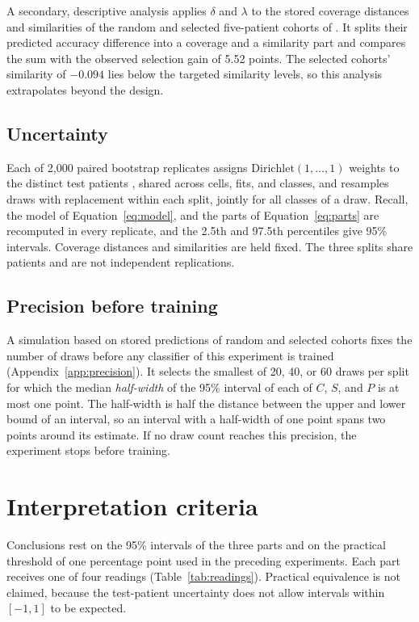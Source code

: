 \documentclass[11pt]{article}
\begin{document}
A secondary, descriptive analysis applies $\delta$ and $\lambda$ to the stored coverage distances and similarities of the random and selected five-patient cohorts of \citet{queisler2026shortageSelection}. It splits their predicted accuracy difference into a coverage and a similarity part and compares the sum with the observed selection gain of 5.52 points. The selected cohorts' similarity of $-0.094$ lies below the targeted similarity levels, so this analysis extrapolates beyond the design.

\subsection{Uncertainty}
\label{sec:uncertainty}
Each of 2,000 paired bootstrap replicates assigns $\mathrm{Dirichlet}(1,\ldots,1)$ weights to the distinct test patients \citep{rubin1981bayesian}, shared across cells, fits, and classes, and resamples draws with replacement within each split, jointly for all classes of a draw. Recall, the model of Equation~\eqref{eq:model}, and the parts of Equation~\eqref{eq:parts} are recomputed in every replicate, and the 2.5th and 97.5th percentiles give 95\% intervals. Coverage distances and similarities are held fixed. The three splits share patients and are not independent replications.

\subsection{Precision before training}
\label{sec:precision}
A simulation based on stored predictions of random and selected cohorts fixes the number of draws before any classifier of this experiment is trained (Appendix~\ref{app:precision}). It selects the smallest of 20, 40, or 60 draws per split for which the median \emph{half-width} of the 95\% interval of each of $C$, $S$, and $P$ is at most one point. The half-width is half the distance between the upper and lower bound of an interval, so an interval with a half-width of one point spans two points around its estimate. If no draw count reaches this precision, the experiment stops before training.

\section{Interpretation criteria}
\label{sec:interpretation}
Conclusions rest on the 95\% intervals of the three parts and on the practical threshold of one percentage point used in the preceding experiments. Each part receives one of four readings (Table~\ref{tab:readings}). Practical equivalence is not claimed, because the test-patient uncertainty does not allow intervals within $[-1,1]$ to be expected.
\end{document}
